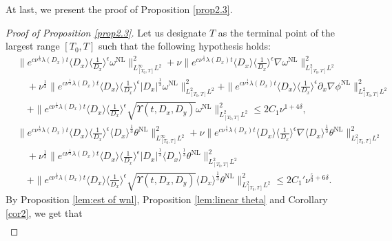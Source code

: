 \documentclass[reqno, 12pt]{amsart} %
\theoremstyle{plain} %
\theoremstyle{definition}
\theoremstyle{remark}
\numberwithin{equation}{section} %
\begin{document}
	At last, we present the proof of Proposition \ref{prop2.3}.
	\begin{proof}[Proof of Proposition \ref{prop2.3}]
		Let us designate $T$ as the terminal point of the largest range $[T_0, T]$ such that the following hypothesis holds:
		\begin{align*}
			& \| e^{c \nu^{\frac{1}{3}} \lambda\left(D_x\right) t}\langle D_x\rangle\langle\frac{1}{D_x}\rangle^\epsilon \omega^{\mathrm{NL}}\|_{L_{[T_0, T]}^\infty L^2}^2+\nu\|e^{c \nu^{\frac{1}{3}} \lambda\left(D_x\right) t}\langle D_x\rangle\langle\frac{1}{D_x}\rangle^\epsilon \nabla \omega^{\mathrm{NL}}\|_{L_{[T_0, T]}^2L^2}^2 \\
			& \quad+ \nu^{\frac{1}{3}}\|e^{c \nu^{\frac{1}{3}} \lambda\left(D_x\right) t}\langle D_x\rangle\langle\frac{1}{D_x}\rangle^\epsilon\left|D_x\right|^{\frac{1}{3}}  \omega^{\mathrm{NL}}\|_{L_{[T_0, T]}^2 L^2}^2  + \|e^{c \nu^{\frac{1}{3}} \lambda\left(D_x\right) t}\langle D_x\rangle\langle\frac{1}{D_x}\rangle^\epsilon \partial_x \nabla \phi^{\mathrm{NL}}\|_{L_{[T_0, T]}^2 L^2}^2
			\\
			& \quad+\|e^{c \nu^{\frac{1}{3}} \lambda\left(D_x\right) t}\langle D_x\rangle\langle\frac{1}{D_x}\rangle^\epsilon \sqrt{\Upsilon\left(t, D_x, D_y\right)} \omega^{\mathrm{NL}}\|_{L_{[T_0, T]}^2 L^2}^2 \leq 2C_1\nu^{1+4\delta},\\
			& \| e^{c \nu^{\frac{1}{3}} \lambda\left(D_x\right) t}\langle D_x\rangle\langle\frac{1}{D_x}\rangle^\epsilon \langle D_x \rangle^\frac13  \theta^{\mathrm{NL}}\|_{L_{[T_0, T]}^\infty L^2}^2+\nu\|e^{c \nu^{\frac{1}{3}} \lambda\left(D_x\right) t}\langle D_x\rangle\langle\frac{1}{D_x}\rangle^\epsilon \nabla \langle D_x \rangle^\frac13  \theta^{\mathrm{NL}}\|_{L_{[T_0, T]}^2 L^2}^2 \\
			& \quad+ \nu^{\frac{1}{3}}\|e^{c \nu^{\frac{1}{3}} \lambda\left(D_x\right) t}\langle D_x\rangle\langle\frac{1}{D_x}\rangle^\epsilon\left|D_x\right|^{\frac{1}{3}}  \langle D_x \rangle ^\frac13 \theta^{\mathrm{NL}}\|_{L_{[T_0, T]}^2 L^2}^2  
			\\
			& \quad+\|e^{c \nu^{\frac{1}{3}} \lambda\left(D_x\right) t}\langle D_x\rangle\langle\frac{1}{D_x}\rangle^\epsilon \sqrt{\Upsilon\left(t, D_x, D_y\right)} \langle D_x \rangle^\frac13  \theta^{\mathrm{NL}}\|_{L_{[T_0, T]}^2 L^2}^2 \leq 2C_1'\nu^{\frac53 + 6\delta}.  		
		\end{align*}
		By Proposition \ref{lem:est of wnl}, Proposition \ref{lem:linear theta} and Corollary \ref{cor2}, we get that
		\begin{align*}

\end{align*}
\end{proof}
\end{document}
